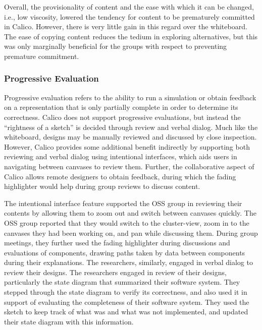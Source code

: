 Overall, the provisionality of content and the ease with which it can be changed, i.e., low viscosity, lowered the tendency for content to be prematurely committed in Calico. However, there is very little gain in this regard over the whiteboard. The ease of copying content reduces the tedium in exploring alternatives, but this was only marginally beneficial for the groups with respect to preventing premature commitment.



\subsubsection{Progressive Evaluation}
Progressive evaluation refers to the ability to run a simulation or obtain feedback on a representation that is only partially complete in order to determine its correctness. Calico does not support progressive evaluations, but instead the ``rightness of a sketch'' is decided through review and verbal dialog. Much like the whiteboard, designs may be manually reviewed and discussed by close inspection. However, Calico provides some additional benefit indirectly by supporting both reviewing and verbal dialog using intentional interfaces, which aids users in navigating between canvases to review them. Further, the collaborative aspect of Calico allows remote designers to obtain feedback, during which the fading highlighter would help during group reviews to discuss content.

The intentional interface feature supported the OSS group in reviewing their contents by allowing them to zoom out and switch between canvases quickly. The OSS group reported that they would switch to the cluster-view, zoom in to the canvases they had been working on, and pan while discussing them. During group meetings, they further used the fading highlighter during discussions and evaluations of components, drawing paths taken by data between components during their explanations. The researchers, similarly, engaged in verbal dialog to review their designs. The researchers engaged in review of their designs, particularly the state diagram that summarized their software system. They stepped through the state diagram to verify its correctness, and also used it in support of evaluating the completeness of their software system. They used the sketch to keep track of what was and what was not implemented, and updated their state diagram with this information.

